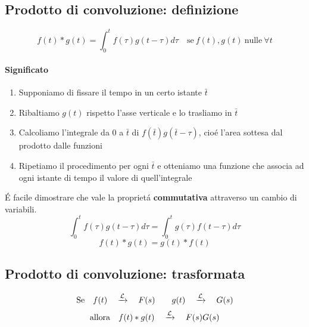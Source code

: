 \documentclass[../main.tex]{subfiles}
\begin{document}
	\subsection{Prodotto di convoluzione: definizione}
	\begin{equation}
		f(t) * g(t) = \int_{0}^{t} f(\tau)g(t-\tau) d\tau \quad \text{se}\ f(t), g(t)\ \text{nulle}\ \forall t
	\end{equation}
	\paragraph{Significato}
	\begin{enumerate}
		\item Supponiamo di fissare il tempo in un certo istante $\bar{t}$
		\item Ribaltiamo $g(t)$ rispetto l'asse verticale e lo trasliamo in $\bar{t}$
		\item Calcoliamo l'integrale da 0 a $\bar{t}$ di $f(\bar{t})g(\bar{t}-\tau)$, cio\'{e} l'area sottesa dal prodotto dalle funzioni
		\item Ripetiamo il procedimento per ogni $\bar{t}$ e otteniamo una funzione che associa ad ogni istante di tempo il valore di quell'integrale
	\end{enumerate}
	\'{E} facile dimostrare che vale la propriet\'{a} \textbf{commutativa} attraverso un cambio di variabili. \label{conv_comm}
	$$ \int_{0}^{t} f(\tau)g(t-\tau) d\tau = \int_{0}^{t} g(\tau)f(t-\tau) d\tau $$
	$$ f(t)*g(t) = g(t)*f(t) $$
	\subsection{Prodotto di convoluzione: trasformata}
	$$ \text{Se} \quad f(t) \quad \xrightarrow{\mathcal{L}} \quad F(s) \qquad g(t) \quad \xrightarrow{\mathcal{L}} \quad G(s) $$
	$$ \text{allora} \quad f(t)*g(t) \quad \xrightarrow{\mathcal{L}} \quad F(s)G(s) $$
\end{document}
